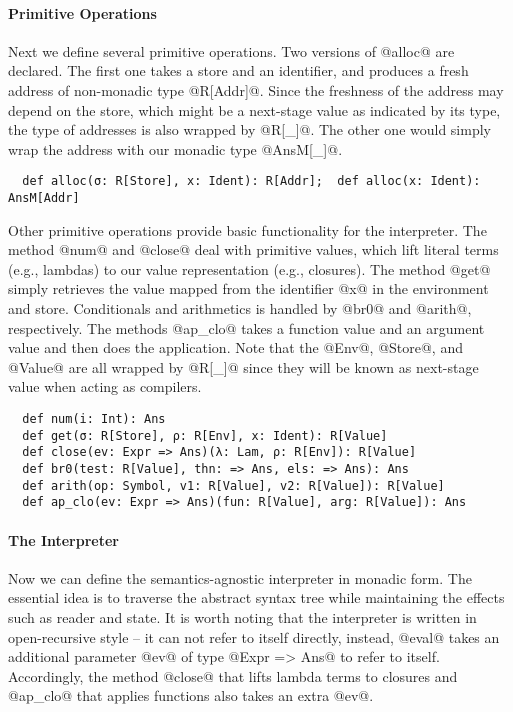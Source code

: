 \paragraph{Primitive Operations} Next we define several primitive operations.
Two versions of @alloc@ are declared. The first one takes a store and an
identifier, and produces a fresh address of non-monadic type @R[Addr]@. Since
the freshness of the address may depend on the store, which might be a
next-stage value as indicated by its type, the type of addresses is also wrapped
by @R[_]@. The other one would simply wrap the address with our monadic type
@AnsM[_]@.
\begin{lstlisting}
  def alloc(σ: R[Store], x: Ident): R[Addr];  def alloc(x: Ident): AnsM[Addr]
\end{lstlisting}

Other primitive operations provide basic functionality for the interpreter.
The method @num@ and @close@ deal with primitive values, which lift literal
terms (e.g., lambdas) to our value representation (e.g., closures).
The method @get@ simply retrieves the value mapped from the identifier @x@ in
the environment and store. Conditionals and arithmetics is handled by @br0@
and @arith@, respectively. The methods @ap_clo@ takes a function value and an
argument value and then does the application. Note that the @Env@, @Store@, and
@Value@ are all wrapped by @R[_]@ since they will be known as next-stage value
when acting as compilers.


\begin{lstlisting}
  def num(i: Int): Ans
  def get(σ: R[Store], ρ: R[Env], x: Ident): R[Value]
  def close(ev: Expr => Ans)(λ: Lam, ρ: R[Env]): R[Value]
  def br0(test: R[Value], thn: => Ans, els: => Ans): Ans
  def arith(op: Symbol, v1: R[Value], v2: R[Value]): R[Value]
  def ap_clo(ev: Expr => Ans)(fun: R[Value], arg: R[Value]): Ans
\end{lstlisting}

\paragraph{The Interpreter} Now we can define the semantics-agnostic interpreter
in monadic form. The essential idea is to traverse the abstract syntax tree
while maintaining the effects such as reader and state. 
It is worth noting that the interpreter is written in open-recursive style -- it
can not refer to itself directly, instead, @eval@ takes an additional parameter
@ev@ of type @Expr => Ans@ to refer to itself. Accordingly, the method @close@
that lifts lambda terms to closures and @ap_clo@ that applies functions also
takes an extra @ev@.

